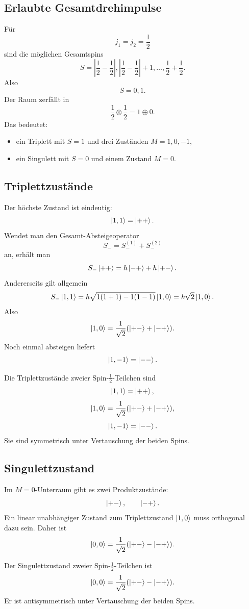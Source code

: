 \subsection{Erlaubte Gesamtdrehimpulse}

Für
\[
    j_1=j_2=\frac12
\]
sind die möglichen Gesamtspins
\[
    S=\left|\frac12-\frac12\right|,
    \left|\frac12-\frac12\right|+1,
    \dots,
    \frac12+\frac12.
\]
Also
\[
    S=0,1.
\]
Der Raum zerfällt in
\[
    \frac12\otimes\frac12 = 1\oplus 0.
\]
Das bedeutet:
\begin{itemize}
    \item ein Triplett mit \(S=1\) und drei Zuständen \(M=1,0,-1\),
    \item ein Singulett mit \(S=0\) und einem Zustand \(M=0\).
\end{itemize}

\subsection{Triplettzustände}

Der höchste Zustand ist eindeutig:
\[
    \left|1,1\right\rangle=\left|++\right\rangle.
\]
Wendet man den Gesamt-Absteigeoperator
\[
    S_- = S^{(1)}_-+S^{(2)}_-
\]
an, erhält man
\[
    S_-\left|++\right\rangle=\hbar\left|-+\right\rangle+\hbar\left|+-\right\rangle.
\]
Andererseits gilt allgemein
\[
    S_-\left|1,1\right\rangle
    =\hbar\sqrt{1(1+1)-1(1-1)}\left|1,0\right\rangle
    =\hbar\sqrt2\left|1,0\right\rangle.
\]
Also
\[
    \left|1,0\right\rangle=\frac{1}{\sqrt2}(\left|+-\right\rangle+\left|-+\right\rangle).
\]
Noch einmal absteigen liefert
\[
    \left|1,-1\right\rangle=\left|--\right\rangle.
\]

\begin{formulabox}
Die Triplettzustände zweier Spin-\(\frac12\)-Teilchen sind
\[
    \left|1,1\right\rangle=\left|++\right\rangle,
\]
\[
    \left|1,0\right\rangle=\frac{1}{\sqrt2}(\left|+-\right\rangle+\left|-+\right\rangle),
\]
\[
    \left|1,-1\right\rangle=\left|--\right\rangle.
\]
Sie sind symmetrisch unter Vertauschung der beiden Spins.
\end{formulabox}

\subsection{Singulettzustand}

Im \(M=0\)-Unterraum gibt es zwei Produktzustände:
\[
    \left|+-\right\rangle,
    \qquad
    \left|-+\right\rangle.
\]
Ein linear unabhängiger Zustand zum Triplettzustand \(\left|1,0\right\rangle\) muss orthogonal dazu sein. Daher ist
\[
    \left|0,0\right\rangle=\frac{1}{\sqrt2}(\left|+-\right\rangle-\left|-+\right\rangle).
\]

\begin{formulabox}
Der Singulettzustand zweier Spin-\(\frac12\)-Teilchen ist
\[
    \left|0,0\right\rangle=\frac{1}{\sqrt2}(\left|+-\right\rangle-\left|-+\right\rangle).
\]
Er ist antisymmetrisch unter Vertauschung der beiden Spins.
\end{formulabox}

